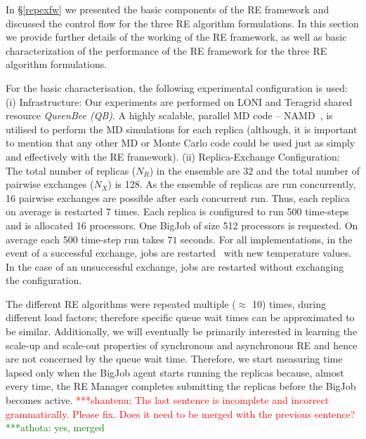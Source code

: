 \documentclass{rspublic}
\newcommand{\jhanote}[1]{ {\textcolor{red} { ***shantenu: #1 }}}
\newcommand{\athotanote}[1]{ {\textcolor{green} { ***athota: #1 }}}
\newcommand{\athotanote}[1]{}
\newcommand{\jhanote}[1]{}
\begin{document}
In \S\ref{repexfw} we presented the basic components of the RE
framework and discussed the control flow for the three RE algorithm
formulations.  In this section we provide further details of the
working of the RE framework, as well as basic characterization of the
performance of the RE framework for the three RE algorithm formulations.


For the basic characterisation, the following experimental
configuration is used: (i) Infrastructure: Our experiments are
performed on LONI and Teragrid shared resource \emph{QueenBee (QB)}. A
highly scalable, parallel MD code -- NAMD~\citep{Phillips:2005gd}, is
utilised to perform the MD simulations for each replica (although, it
is important to mention that any other MD or Monte Carlo code could be
used just as simply and effectively with the RE framework).  (ii)
Replica-Exchange Configuration: The total number of replicas ($N_R$)
in the ensemble are 32 and the total number of pairwise exchanges
($N_X$) is 128. As the ensemble of replicas are run concurrently, 16
pairwise exchanges are possible after each concurrent run. Thus, each
replica on average is restarted 7 times.  Each replica is configured
to run 500 time-steps and is allocated 16 processors. One BigJob of
size 512 processors is requested. On average each 500 time-step run
takes $71$ seconds.  For all implementations, in the event of a
successful exchange, jobs are restarted~\citep{Luckow:2008fp} with new
temperature values.  In the case of an unsuccessful exchange, jobs are
restarted without exchanging the configuration.


The different RE algorithms were repeated multiple ($\approx$ 10)
times, during different load factors; therefore specific queue wait
times can be approximated to be similar.  Additionally, we will
eventually be primarily interested in learning the scale-up and
scale-out properties of synchronous and asynchronous RE and hence are
not concerned by the queue wait time. Therefore, we start measuring
time lapsed only when the BigJob agent starts running the replicas
because, almost every time, the RE Manager completes submitting the
replicas before the BigJob becomes active.  \jhanote{Ths last sentence
  is incomplete and incorrect grammatically. Please fix. Does it need
  to be merged with the previous sentence?} \athotanote{yes, merged}
\end{document}
